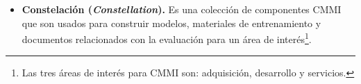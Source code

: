 \begin{itemize}
\item \textbf{Constelación (\textit{Constellation}).} Es una colección de componentes CMMI que son usados para construir modelos, materiales de entrenamiento y documentos relacionados con la evaluación para un área de interés\footnote{Las tres áreas de interés para CMMI son: adquisición, desarrollo y servicios.}.

\end{itemize}
